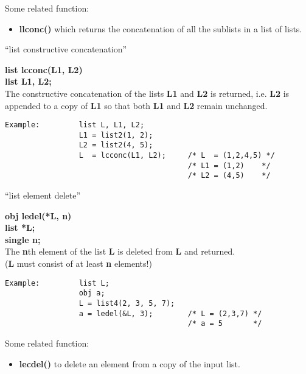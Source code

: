 \vspace*{9.5cm}


Some related function:

\begin{itemize}
\item[] {\bf llconc()} which returns the concatenation of all the sublists in a list of lists.
\end{itemize}

\leer
\begin{center} ``list constructive concatenation'' \end{center}
{\bf list lcconc(L1, L2)\\
list L1, L2;}\\[2ex]
The constructive concatenation of the lists {\bf L1} and {\bf L2} is returned, i.e. {\bf L2} is appended
to a copy of {\bf L1} so that both {\bf L1} and {\bf L2} remain unchanged.

\begin{verbatim}
Example:         list L, L1, L2;
                 L1 = list2(1, 2);
                 L2 = list2(4, 5);
                 L  = lcconc(L1, L2);     /* L  = (1,2,4,5) */
                                          /* L1 = (1,2)    */
                                          /* L2 = (4,5)    */
\end{verbatim}

\newpage

\begin{center} ``list element delete'' \end{center}
{\bf obj ledel(*L, n)\\
list *L;\\
single n;}\\[2ex]
The {\bf n}th element of the list {\bf L} is deleted from {\bf L} and returned.\\
({\bf L} must consist of at least {\bf n} elements!)

\begin{verbatim}
Example:         list L;
                 obj a;
                 L = list4(2, 3, 5, 7);
                 a = ledel(&L, 3);        /* L = (2,3,7) */
                                          /* a = 5       */
\end{verbatim}

Some related function:

\begin{itemize}
\item[] {\bf lecdel()} to delete an element from a copy of the input list.
\end{itemize}


